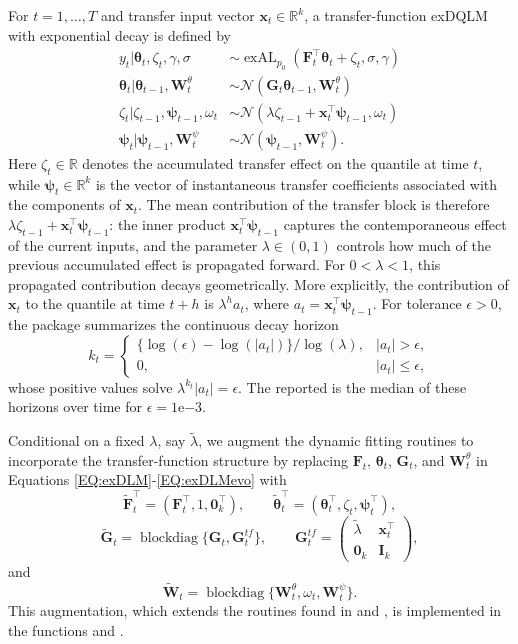 \documentclass{jss}
\newcommand{\vect}[1]{\boldsymbol{#1}}
\newcommand{\mat}[1]{\mathbf{#1}}
\newcommand{\N}{\mathcal{N}}
\newcommand{\exAL}{\operatorname{exAL}}
\begin{document}
For $t=1,\dots,T$ and transfer input vector $\mat{x}_t \in \mathbb{R}^k$, a transfer-function exDQLM with exponential decay is defined by
\begin{align}
\label{EQ:begin_transfer}
y_t | \vect{\theta}_t,\zeta_t,\gamma,\sigma  & \sim \exAL_{p_0}(\mat{F}_t^\top \vect{\theta}_t +  \zeta_{t},\sigma,\gamma) \\
\vect{\theta}_t | \vect{\theta}_{t-1},\mat{W}_t^\theta  & \sim  \N(\mat{G}_t \vect{\theta}_{t-1},\mat{W}_t^\theta) \\
\label{EQ:transfer_effect}
\zeta_{t}|\zeta_{t-1},\vect{\psi}_{t-1},\omega_{t} & \sim \N(\lambda \zeta_{t-1} + \mat{x}_{t}^\top \vect{\psi}_{t-1},\omega_{t}) \\
\label{EQ:end_transfer}
\vect{\psi}_{t}|\vect{\psi}_{t-1},\mat{W}_{t}^{\psi} & \sim \N(\vect{\psi}_{t-1},\mat{W}_{t}^{\psi}).
\end{align}
Here $\zeta_t \in \mathbb{R}$ denotes the accumulated transfer effect on the quantile at time $t$, while $\vect{\psi}_t \in \mathbb{R}^k$ is the vector of instantaneous transfer coefficients associated with the components of $\mat{x}_t$. The mean contribution of the transfer block is therefore $\lambda \zeta_{t-1} + \mat{x}_t^\top \vect{\psi}_{t-1}$: the inner product $\mat{x}_t^\top \vect{\psi}_{t-1}$ captures the contemporaneous effect of the current inputs, and the parameter $\lambda\in(0,1)$ controls how much of the previous accumulated effect is propagated forward. For $0<\lambda<1$, this propagated contribution decays geometrically. More explicitly, the contribution of $\mat{x}_t$ to the quantile at time $t+h$ is $\lambda^h a_t$, where \(a_t=\mat{x}_t^\top \vect{\psi}_{t-1}\). For tolerance $\epsilon>0$, the package summarizes the continuous decay horizon
\[
k_t =
\begin{cases}
\{\log(\epsilon)-\log(|a_t|)\}/\log(\lambda), & |a_t|>\epsilon,\\
0, & |a_t|\leq \epsilon,
\end{cases}
\]
whose positive values solve \(\lambda^{k_t}|a_t|=\epsilon\). The reported  is the median of these horizons over time for $\epsilon = 1\mathrm{e}{-3}$.

Conditional on a fixed $\lambda$, say $\tilde\lambda$, we augment the dynamic fitting routines to incorporate the transfer-function structure by replacing $\mat{F}_t$, $\vect{\theta}_t$, $\mat{G}_t$, and $\mat{W}_t^\theta$ in Equations \eqref{EQ:exDLM}-\eqref{EQ:exDLMevo} with
\[
\tilde{\mat{F}}_t^\top = (\mat{F}_t^\top, 1, \mat{0}_k^\top), \qquad
\tilde{\vect{\theta}}_t^\top = (\vect{\theta}_t^\top,\zeta_t,\vect{\psi}_t^\top),
\]
\[
\tilde{\mat{G}}_t = \operatorname{blockdiag}\{\mat{G}_t, \mat{G}^{tf}_t\},
\qquad
\mat{G}^{tf}_t =
\begin{pmatrix}
\tilde\lambda & \mat{x}_t^\top \\
\mat{0}_k & \mat{I}_k
\end{pmatrix},
\]
and
\[
\tilde{\mat{W}}_t = \operatorname{blockdiag}\{\mat{W}_t^\theta,\omega_t,\mat{W}_t^\psi\}.
\]
This augmentation, which extends the routines found in  and , is implemented in the functions  and .
\end{document}
